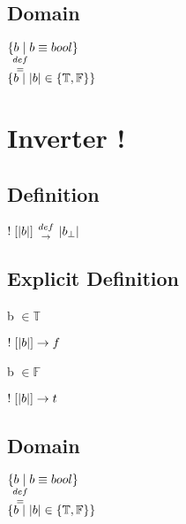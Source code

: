 \documentclass[11pt]{article}
\def \fdef{\hspace{1mm} {def \atop \rightarrow} \hspace{1mm}}
\def \feq{\hspace{1mm} {def \atop =} \hspace{1mm}}
\begin{document}
\subsection{Domain}
\begin{center}
$
\{ b \hspace{1mm}| \hspace{1mm} b \equiv bool\}
$
\\ \vspace{2mm}
$
\feq
$
\\ \vspace{2mm}
$
\{ b \hspace{1mm}| \hspace{1mm} |b| \in \{\mathbb{T}, \mathbb{F}\}\}
$
\end{center}
\section{Inverter !}
\subsection{Definition}
\begin{center}
$
! \hspace{1mm}[|b|] \fdef |b_{\perp}|
$
\end{center}
\subsection{Explicit Definition}
\vspace{2mm}
b $\in \mathbb{T}$
\begin{center}
$
! \hspace{1mm}[|b|] \rightarrow f
$
\end{center}
b $\in \mathbb{F}$
\begin{center}
$
! \hspace{1mm}[|b|] \rightarrow t
$
\end{center}
\subsection{Domain}
\begin{center}
$
\{ b \hspace{1mm}| \hspace{1mm} b \equiv bool\}
$
\\ \vspace{2mm}
$
\feq
$
\\ \vspace{2mm}
$
\{ b \hspace{1mm}| \hspace{1mm} |b| \in \{\mathbb{T}, \mathbb{F}\}\}
$
\end{center}
\end{document}
